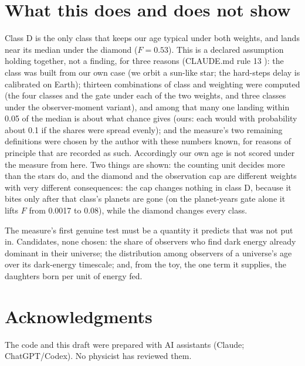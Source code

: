 \documentclass[pre,twocolumn,superscriptaddress,nofootinbib]{revtex4-2}
\begin{document}
\section{What this does and does not show}

Class D is the only class that keeps our age typical under both weights, and lands near its median under the diamond
($F = 0.53$). This is a declared assumption holding together, not a finding, for three reasons (CLAUDE.md rule 13
\cite{repo}): the class was built from our own case (we orbit a sun-like star; the hard-steps delay is calibrated on
Earth); thirteen combinations of class and weighting were computed (the four classes and the gate under each of the
two weights, and three classes under the observer-moment variant), and among that many one landing within 0.05 of the
median is about what chance gives (ours: each would with probability about 0.1 if the shares were spread evenly); and
the measure's two remaining definitions were chosen by the author with these numbers known, for reasons of principle
that are recorded as such. Accordingly our own age is not scored under the measure from here.
Two things are shown: the counting unit decides more than the stars do, and the diamond and the observation cap are
different weights with very different consequences: the cap changes nothing in class D, because it bites only after
that class's planets are gone (on the planet-years gate alone it lifts $F$ from 0.0017 to 0.08), while the diamond
changes every class.

The measure's first genuine test must be a quantity it predicts that was not put in. Candidates, none chosen: the
share of observers who find dark energy already dominant in their universe; the distribution among observers of a
universe's age over its dark-energy timescale; and, from the toy, the one term it supplies, the daughters born per unit
of energy fed.

\section*{Acknowledgments}
The code and this draft were prepared with AI assistants (Claude; ChatGPT/Codex). No physicist has reviewed them.
\end{document}
